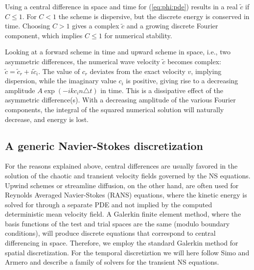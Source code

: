 Using a central difference in space and time for (\ref{eq:phi:pde})
results in a real $\tilde c$ if $C\leq 1$.
For $C<1$ the scheme is dispersive, but
the discrete energy  is conserved in time.
Choosing $C>1$ gives a complex $\tilde c$ and a growing discrete Fourier
component, which implies $C\leq1$ for numerical stability.

Looking at a forward scheme in time and upward scheme in space, i.e.,
two asymmetric differences, the numerical wave velocity $\tilde c$ becomes
complex: $\tilde c = \tilde c_r + i\tilde c_i$.
The value of $c_r$ deviates from the exact velocity $v$, implying
dispersion, while the imaginary value $c_i$ is positive, giving rise
to a decreasing amplitude $A\exp{(-ikc_i n\triangle t)}$ in time.
This is a dissipative effect of the asymmetric difference(s).
With a decreasing amplitude of the various
Fourier components, the integral of the squared numerical solution will
naturally decrease, and energy is lost.


\subsection{A generic Navier-Stokes discretization}
\label{sec:NS-solver}

For the reasons explained above, central differences are
usually favored in the solution of the chaotic and transient velocity
fields governed by the NS equations. Upwind schemes or streamline
diffusion, on the other hand, are often used for Reynolds Averaged
Navier-Stokes (RANS) equations, where the kinetic energy is solved for
through a separate PDE and not implied by the computed deterministic
mean velocity field. A Galerkin finite element method, where the basis functions
of the test and trial spaces are the same (modulo boundary conditions),
will produce discrete equations that correspond to central differencing
in space. Therefore, we employ the standard Galerkin method for spatial
discretization. For the temporal
discretiztion we will here follow Simo and Armero \cite{SimoArmero1994} and describe a family of solvers for the transient NS equations.

